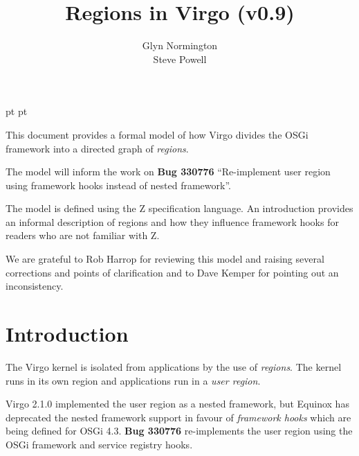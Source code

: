 \documentclass[a4paper,9pt]{article}
\begin{document}
 pt
 pt

\title{Regions in Virgo (v0.9)}
\author{Glyn Normington\\Steve Powell}

\maketitle
\thispagestyle{myheadings}
\setcounter{page}{0}

This document provides a formal model of how Virgo divides the OSGi framework into a directed graph
of \textit{regions}.

The model will inform the work on \textbf{Bug 330776} ``Re-implement user region using
framework hooks instead of nested framework''.

The model is defined using the Z specification language. An introduction provides an informal
description of regions and how they influence framework hooks for readers who are not familiar with Z.

We are grateful to Rob Harrop for reviewing this model and raising several corrections and
points of clarification and to Dave Kemper for pointing out an inconsistency.

\clearpage
{}
\tableofcontents

\newcommand{\true}{true}
\newcommand{\false}{false}
\renewcommand{\emptyset}{\varnothing}
\newcommand{\ModuleDefZero}{ModuleDef_0}
\newcommand{\ModuleDefOne}{ModuleDef_1}
\newcommand{\ModuleDefTwo}{ModuleDef_2}
\newcommand{\ModuleDefThree}{ModuleDef_3}
\newcommand{\ModuleDefFour}{ModuleDef_4}

\clearpage
{}
\section{Introduction}
\label{cha:intro}

The Virgo kernel is isolated from applications by the use of \textit{regions}.
The kernel runs in its own region and applications run in a \textit{user region}.

Virgo 2.1.0 implemented the user region as a nested framework, but Equinox
has deprecated the nested framework support in favour of \textit{framework hooks}
which are being defined for OSGi 4.3.
\textbf{Bug 330776} re-implements the user region using the OSGi framework and service
registry hooks.
\end{document}
